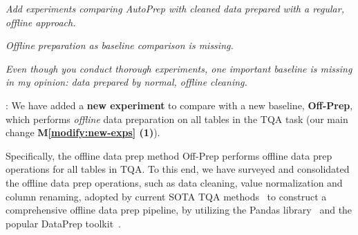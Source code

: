 





\begin{shaded}
{
 \emph{Add experiments comparing AutoPrep with cleaned data prepared with a regular, offline approach.}

\emph{Offline preparation as baseline comparison is missing.}

\emph{Even though you conduct thorough experiments, one important baseline is missing in my opinion: data prepared by normal, offline cleaning.}

}
\end{shaded}

:
We have added a \textbf{new experiment} to compare \sys with a new baseline, \textbf{Off-Prep}, which performs \emph{offline} data preparation on all tables in the TQA task (our main change \textbf{M\ref{modify:new-exps} (1)}). 

Specifically, the offline data prep method Off-Prep performs offline data prep operations for all tables in TQA. To this end, we have surveyed and consolidated the offline data prep operations, such as data cleaning, value normalization and column renaming, adopted by current SOTA TQA methods~\cite{yao2022react, cheng2023binding, khot2022decomposed, wang2024chain, DBLP:journals/pvldb/ZhuCXLSZSTL24} to construct a comprehensive offline data prep pipeline, by utilizing the Pandas library~\cite{mckinney-proc-scipy-2010} and the popular DataPrep toolkit~\cite{dataprepeda2021}.


